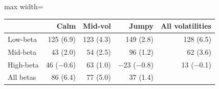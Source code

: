 {\small
\begin{adjustbox}{max width=\linewidth}
\begin{tabular}{lrrrr}
\toprule
 & Calm & Mid-vol & Jumpy & All volatilities \\
\midrule
Low-beta & 125 (6.9) & 123 (4.3) & 149 (2.8) & 128 (6.5) \\
Mid-beta & 43 (2.0) & 54 (2.5) & 96 (1.2) & 62 (3.6) \\
High-beta & 46 ($-$0.6) & 63 (1.0) & $-$23 ($-$0.8) & 13 ($-$0.1) \\
\midrule
All betas & 86 (6.4) & 77 (5.0) & 37 (1.4) &  \\
\bottomrule
\end{tabular}
\end{adjustbox}
}
